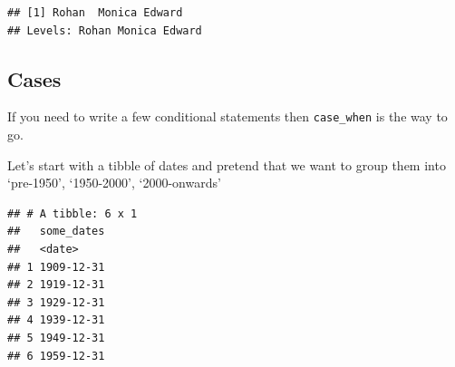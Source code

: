 \documentclass[
]{book}
\newenvironment{Shaded}{\begin{snugshade}}{\end{snugshade}}
\newcommand{\DataTypeTok}[1]{\textcolor[rgb]{0.13,0.29,0.53}{#1}}
\newcommand{\KeywordTok}[1]{\textcolor[rgb]{0.13,0.29,0.53}{\textbf{#1}}}
\newcommand{\NormalTok}[1]{#1}
\newcommand{\OperatorTok}[1]{\textcolor[rgb]{0.81,0.36,0.00}{\textbf{#1}}}
\newcommand{\StringTok}[1]{\textcolor[rgb]{0.31,0.60,0.02}{#1}}
\begin{document}
\begin{Shaded}
\end{Shaded}

\begin{verbatim}
## [1] Rohan  Monica Edward
## Levels: Rohan Monica Edward
\end{verbatim}

\hypertarget{cases}{%
\subsection{Cases}\label{cases}}

If you need to write a few conditional statements then \texttt{case\_when} is the way to go.

Let's start with a tibble of dates and pretend that we want to group them into `pre-1950', `1950-2000', `2000-onwards'

\begin{Shaded}
\end{Shaded}

\begin{verbatim}
## # A tibble: 6 x 1
##   some_dates
##   <date>    
## 1 1909-12-31
## 2 1919-12-31
## 3 1929-12-31
## 4 1939-12-31
## 5 1949-12-31
## 6 1959-12-31
\end{verbatim}
\end{document}
